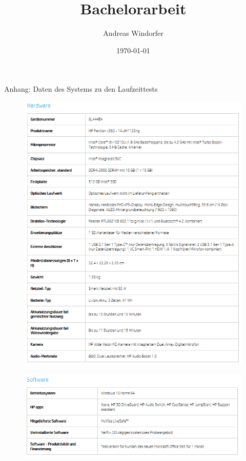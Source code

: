 \documentclass[a4paper,12pt]{article}
\title{Bachelorarbeit}
\author{
	Andreas Windorfer\\
}
\date{\today}
\begin{document}
\large Anhang: Daten des Systems zu den Laufzeittests

\begin{figure}[H]
	\centering
	\includegraphics[width= 1\textwidth]{"Medien/laufzeittest/hpHard"}

\end{figure}
\begin{figure}[H]
	\centering
	\includegraphics[width= 1\textwidth]{"Medien/laufzeittest/hpSoft"}
\end{figure}
\end{document}
